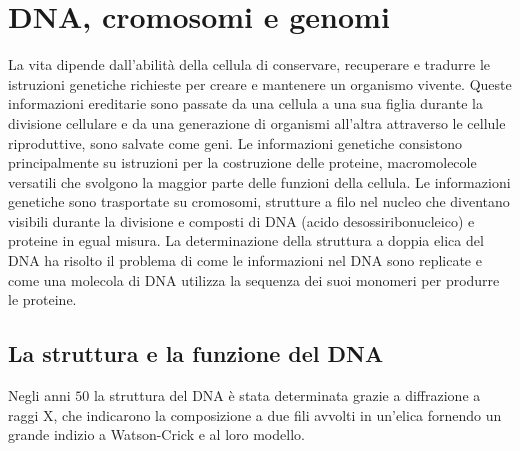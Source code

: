 \chapter{DNA, cromosomi e genomi}
La vita dipende dall'abilit\`a della cellula di conservare, recuperare e tradurre le istruzioni genetiche richieste per creare e mantenere un organismo vivente. Queste informazioni
ereditarie sono passate da una cellula a una sua figlia durante la divisione cellulare e da una generazione di organismi all'altra attraverso le cellule riproduttive, sono salvate come
geni. Le informazioni genetiche consistono principalmente su istruzioni per la costruzione delle proteine, macromolecole versatili che svolgono la maggior parte delle funzioni della 
cellula. Le informazioni genetiche sono trasportate su cromosomi, strutture a filo nel nucleo che diventano visibili durante la divisione e composti di DNA (acido desossiribonucleico) e 
proteine in egual misura. La determinazione della struttura a doppia elica del DNA ha risolto il problema di come le informazioni nel DNA sono replicate e come una molecola di DNA 
utilizza la sequenza dei suoi monomeri per produrre le proteine. 
\section{La struttura e la funzione del DNA}
Negli anni $50$ la struttura del DNA \`e stata determinata grazie a diffrazione a raggi X, che indicarono la composizione a due fili avvolti in un'elica fornendo un grande indizio a
Watson-Crick e al loro modello.
